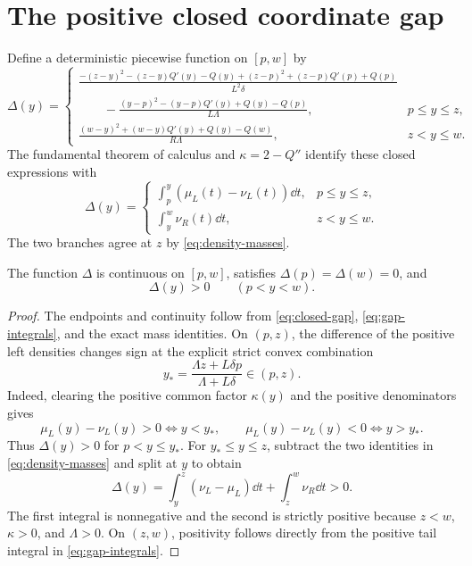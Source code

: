 \section{The positive closed coordinate gap}\label{sec:crossing}

Define a deterministic piecewise function on \([p,w]\) by
\begin{equation}\label{eq:closed-gap}
 \Delta(y)=
 \begin{cases}
 \displaystyle
 \frac{-(z-y)^2-(z-y)Q'(y)-Q(y)+(z-p)^2+(z-p)Q'(p)+Q(p)}
      {L^2\delta}\\[3pt]
 \displaystyle\qquad
 -\frac{(y-p)^2-(y-p)Q'(y)+Q(y)-Q(p)}{L\Lambda},
 &p\leq y\leq z,\\[12pt]
 \displaystyle
 \frac{(w-y)^2+(w-y)Q'(y)+Q(y)-Q(w)}{R\Lambda},
 &z<y\leq w.
 \end{cases}
\end{equation}
The fundamental theorem of calculus and \(\kappa=2-Q''\) identify these
closed expressions with
\begin{equation}\label{eq:gap-integrals}
 \Delta(y)=
 \begin{cases}
 \displaystyle\int_p^y(\mu_L(t)-\nu_L(t))\dd t,&p\leq y\leq z,\\[6pt]
 \displaystyle\int_y^w\nu_R(t)\dd t,&z<y\leq w.
 \end{cases}
\end{equation}
The two branches agree at \(z\) by \eqref{eq:density-masses}.

\begin{lemma}\label{lem:crossing}
The function \(\Delta\) is continuous on \([p,w]\), satisfies
\(\Delta(p)=\Delta(w)=0\), and
\[
 \Delta(y)>0\qquad(p<y<w).
\]
\end{lemma}

\begin{proof}
The endpoints and continuity follow from \eqref{eq:closed-gap},
\eqref{eq:gap-integrals}, and the exact mass identities. On \((p,z)\), the
difference of the positive left densities changes sign at the explicit strict
convex combination
\[
 y_* = \frac{\Lambda z+L\delta p}{\Lambda+L\delta}\in(p,z).
\]
Indeed, clearing the positive common factor \(\kappa(y)\) and the positive
denominators gives
\[
 \mu_L(y)-\nu_L(y)>0\iff y<y_*,
 \qquad
 \mu_L(y)-\nu_L(y)<0\iff y>y_*.
\]
Thus \(\Delta(y)>0\) for \(p<y\leq y_*\). For \(y_*\leq y\leq z\), subtract
the two identities in \eqref{eq:density-masses} and split at \(y\) to obtain
\[
 \Delta(y)=\int_y^z(\nu_L-\mu_L)\dd t+\int_z^w\nu_R\dd t>0.
\]
The first integral is nonnegative and the second is strictly positive because
\(z<w\), \(\kappa>0\), and \(\Lambda>0\). On \((z,w)\), positivity follows
directly from the positive tail integral in \eqref{eq:gap-integrals}.
\end{proof}

